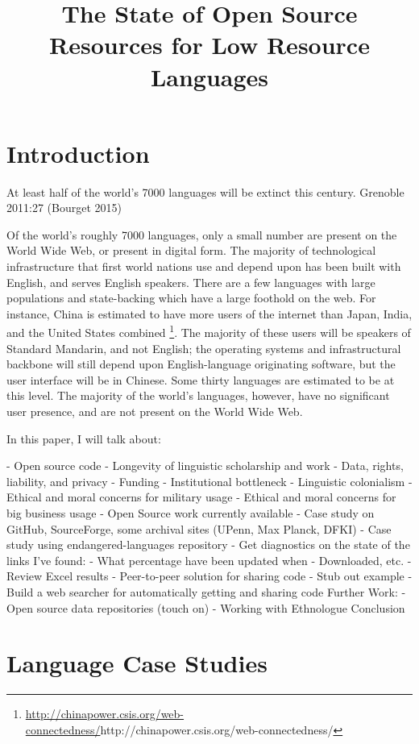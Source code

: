 \documentclass[10pt, a4paper]{article}
\title{The State of Open Source Resources for Low Resource Languages}
\begin{document}
\maketitleabstract

\section{Introduction}

At least half of the world's 7000 languages will be extinct this century. Grenoble 2011:27 (Bourget 2015)

Of the world's roughly 7000 languages, only a small number are present on the World Wide Web, or present in digital form. The majority of technological infrastructure that first world nations use and depend upon has been built with English, and serves English speakers. There are a few languages with large populations and state-backing which have a large foothold on the web. For instance, China is estimated to have more users of the internet than Japan, India, and the United States combined \footnote{\url{http://chinapower.csis.org/web-connectedness/}{http://chinapower.csis.org/web-connectedness/}}. The majority of these users will be speakers of Standard Mandarin, and not English; the operating systems and infrastructural backbone will still depend upon English-language originating software, but the user interface will be in Chinese. Some thirty languages %
 are estimated to be at this level. The majority of the world's languages, however, have no significant user presence, and are not present on the World Wide Web.

In this paper, I will talk about:

- Open source code
  -  Longevity of linguistic scholarship and work
  - Data, rights, liability, and privacy
  - Funding
    - Institutional bottleneck
    - Linguistic colonialism
    - Ethical and moral concerns for military usage
    - Ethical and moral concerns for big business usage
- Open Source work currently available
  - Case study on GitHub, SourceForge, some archival sites (UPenn, Max Planck, DFKI)
- Case study using endangered-languages repository
  - Get diagnostics on the state of the links I've found:
    - What percentage have been updated when
    - Downloaded, etc.
  - Review Excel results
- Peer-to-peer solution for sharing code
  - Stub out example
  - Build a web searcher for automatically getting and sharing code
Further Work:
  - Open source data repositories (touch on)
  - Working with Ethnologue
Conclusion


\section{Language Case Studies}
\end{document}
